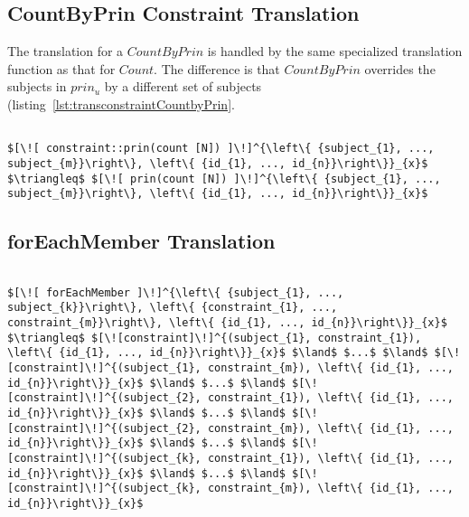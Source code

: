\subsection{CountByPrin Constraint Translation}
The translation for a $CountByPrin$ is handled by the same specialized translation function as that for $Count$. The difference is that $CountByPrin$ overrides the subjects in $prin_{u}$ by a different set of subjects (listing~\ref{lst:transconstraintCountbyPrin}.

\lstset{mathescape, language=AST}  
\begin{lstlisting}[frame=single, caption={Constraint Translation {$\colon$} Count by Principal},label={lst:transconstraintCountbyPrin}]

$[\![ constraint::prin(count [N]) ]\!]^{\left\{ {subject_{1}, ..., subject_{m}}\right\}, \left\{ {id_{1}, ..., id_{n}}\right\}}_{x}$ $\triangleq$ $[\![ prin(count [N]) ]\!]^{\left\{ {subject_{1}, ..., subject_{m}}\right\}, \left\{ {id_{1}, ..., id_{n}}\right\}}_{x}$ 
\end{lstlisting}


\subsection{forEachMember Translation}

\lstset{mathescape, language=AST}  
\begin{lstlisting}[frame=single, caption={ForEachMember Translation {$\colon$} Count by Principal},label={lst:transforEachMember}]

$[\![ forEachMember ]\!]^{\left\{ {subject_{1}, ..., subject_{k}}\right\}, \left\{ {constraint_{1}, ..., constraint_{m}}\right\}, \left\{ {id_{1}, ..., id_{n}}\right\}}_{x}$ $\triangleq$ $[\![constraint]\!]^{(subject_{1}, constraint_{1}), \left\{ {id_{1}, ..., id_{n}}\right\}}_{x}$ $\land$ $...$ $\land$ $[\![constraint]\!]^{(subject_{1}, constraint_{m}), \left\{ {id_{1}, ..., id_{n}}\right\}}_{x}$ $\land$ $...$ $\land$ $[\![constraint]\!]^{(subject_{2}, constraint_{1}), \left\{ {id_{1}, ..., id_{n}}\right\}}_{x}$ $\land$ $...$ $\land$ $[\![constraint]\!]^{(subject_{2}, constraint_{m}), \left\{ {id_{1}, ..., id_{n}}\right\}}_{x}$ $\land$ $...$ $\land$ $[\![constraint]\!]^{(subject_{k}, constraint_{1}), \left\{ {id_{1}, ..., id_{n}}\right\}}_{x}$ $\land$ $...$ $\land$ $[\![constraint]\!]^{(subject_{k}, constraint_{m}), \left\{ {id_{1}, ..., id_{n}}\right\}}_{x}$ 

\end{lstlisting}

